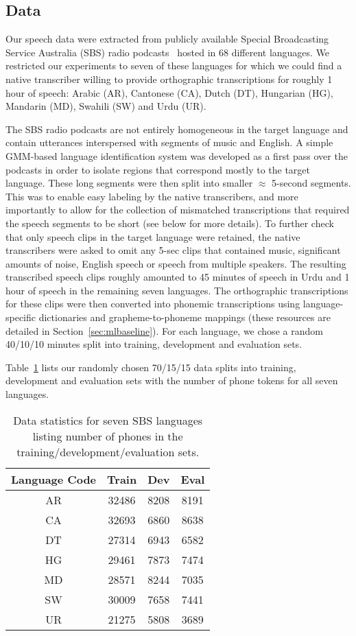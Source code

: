 
\subsection{Data}
\label{sec:data}

Our speech data were extracted from publicly available Special Broadcasting Service Australia (SBS) radio podcasts~\cite{SBS} hosted in 68 different languages. We restricted our experiments to seven of these languages for which we could find a native transcriber willing to provide orthographic transcriptions for roughly 1 hour of speech: Arabic (AR), Cantonese (CA), Dutch (DT), Hungarian (HG), Mandarin (MD), Swahili (SW) and Urdu (UR).

The SBS radio podcasts are not entirely homogeneous in the target language and contain utterances interspersed with segments of music and English. A simple GMM-based language identification system was developed as a first pass over the podcasts in order to isolate regions that correspond mostly to the target language. These long segments were then split into smaller $\approx$ 5-second segments. This was to enable easy labeling by the native transcribers, and more importantly to allow for the collection of mismatched transcriptions that required the speech segments to be short (see below for more details). To further check that only speech clips in the target language were retained, the native transcribers were asked to omit any 5-sec clips that contained music, significant amounts of noise, English speech or speech from multiple speakers. The resulting transcribed speech clips roughly amounted to 45 minutes of speech in Urdu and 1 hour of speech in the remaining seven languages. The orthographic transcriptions for these clips were then converted into phonemic transcriptions using language-specific dictionaries and grapheme-to-phoneme mappings (these resources are detailed in Section~\ref{sec:mlbaseline}). For each language, we chose a random 40/10/10 minutes split into training, development and evaluation sets. 

Table~\ref{tab:data} lists our randomly chosen 70/15/15 data splits into training, development and evaluation sets with the number of phone tokens for all seven languages. 

\begin{table}[t]
\centering
\begin{tabular}{| c || c | c | c |}
\hline
Language Code & Train & Dev & Eval \\
\hline
AR & 32486 & 8208 & 8191\\
CA & 32693 & 6860 & 8638 \\
DT & 27314 & 6943 & 6582 \\
HG & 29461 & 7873 & 7474\\
MD & 28571 & 8244 & 7035\\
SW & 30009 & 7658 & 7441 \\
UR & 21275 & 5808 & 3689 \\
\hline
\end{tabular}
\caption{Data statistics for seven SBS languages listing number of phones in the training/development/evaluation sets.}
\label{tab:data}
\end{table}
